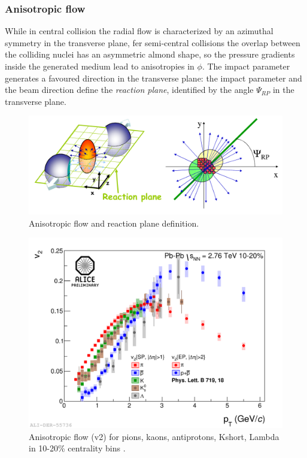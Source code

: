 \subsubsection{Anisotropic flow}
While in central collision the radial flow is characterized by an azimuthal symmetry in the transverse plane, fer semi-central collisions the overlap between the colliding nuclei has an asymmetric almond shape, so the pressure gradients inside the generated medium lead to anisotropies in $\phi$. The impact parameter generates a favoured direction in the transverse plane: the impact parameter and the beam direction define the \textit{reaction plane}, identified by the angle $\Psi_{RP}$ in the transverse plane.\\
%
\begin{figure}
  \centering
  \includegraphics[scale=0.3]{figures/flow.png}
  \caption{Anisotropic flow and reaction plane definition.}
  \label{fig:flow}
\end{figure}
%
\begin{figure}
  \centering
  \includegraphics[scale=0.15]{figures/aniflow.png}
  \caption{Anisotropic flow (v2) for pions, kaons, antiprotons, Kshort, Lambda in 10-20\% centrality bins \cite{elliptic}.}
  \label{fig:aniflow}
\end{figure}
